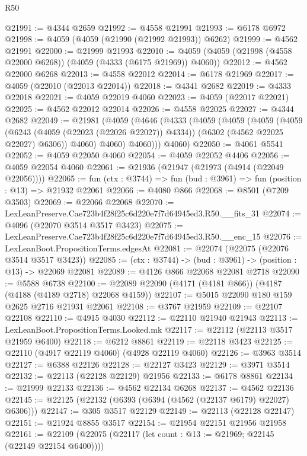 \begin{lexlean}{R50}
\begin{coremodule}
@21991 := @4344 @2659
@21992 := @4558 @21991
@21993 := @6178 @6972
@21998 := @4059 (@4059 (@21990 (@21992 @21993)) @6262)
@21999 := @4562 @21991
@22000 := @21999 @21993
@22010 := @4059 (@4059 (@21998 (@4558 @22000 @6268)) (@4059 (@4333 (@6175 @21969)) @4060))
@22012 := @4562 @22000 @6268
@22013 := @4558 @22012
@22014 := @6178 @21969
@22017 := @4059 (@22010 (@22013 @22014))
@22018 := @4341 @2682
@22019 := @4333 @22018
@22021 := @4059 @22019 @4060
@22023 := @4059 (@22017 @22021)
@22025 := @4562 @22012 @22014
@22026 := @4558 @22025
@22027 := @4344 @2682
@22049 := @21981
    (@4059
      (@4646
        (@4333
          (@4059
            (@4059
              (@4059
                (@4059
                  (@6243 (@4059 (@22023 (@22026 @22027)) @4334))
                  (@6302 (@4562 @22025 @22027) @6306))
                @4060)
              @4060)
            @4060)))
      @4060)
@22050 := @4061 @5541
@22052 := @4059 @22050 @4060
@22054 := @4059 @22052 @4406
@22056 := @4059 @22054 @4060
@22061 := @21936 (@21947 (@21973 (@4914 (@22049 @22056))))
@22065 := fun (ctx : @3744) => fun (bud : @3961) => fun (position : @13) => @21932 @22061
@22066 := @4080 @866
@22068 := @8501 (@7209 @3503)
@22069 := @22066 @22068
@22070 := LexLeanPreserve.Cae723b4f28f25c6d220e7f7d64945ed3.R50.__fits_31
@22074 := @4096 (@22070 @3514 @3517 @3423)
@22075 := LexLeanPreserve.Cae723b4f28f25c6d220e7f7d64945ed3.R50.__enc_15
@22076 := LexLeanBoot.PropositionTerms.edgesAt
@22081 := @22074 (@22075 (@22076 @3514 @3517 @3423))
@22085 := (ctx : @3744) -> (bud : @3961) -> (position : @13) -> @22069 @22081
@22089 := @4126 @866 @22068 @22081 @2718
@22090 := @5588 @6738
@22100 := @22089 @22090 (@4171 (@4181 @866)) (@4187 (@4188 (@4189 @2718) @22068 @4159))
@22107 := @5015 @22090 @180 @159 @2625 @2716 @21931 @22061
@22108 := @3767 @21959
@22109 := @22107 @22108
@22110 := @4915 @4030
@22112 := @22110 @21940 @21943
@22113 := LexLeanBoot.PropositionTerms.Looked.mk
@22117 := @22112 (@22113 @3517 @21959 @6400)
@22118 := @6212 @8861
@22119 := @22118 @3423
@22125 := @22110 (@4917 @22119 @4060) (@4928 @22119 @4060)
@22126 := @3963 @3514
@22127 := @6388 @22126
@22128 := @22127 @3423
@22129 := @3971 @3514
@22132 := @22113 (@22128 @22129) @21956
@22133 := @6178 @8861
@22134 := @21999 @22133
@22136 := @4562 @22134 @6268
@22137 := @4562 @22136
@22145 := @22125 (@22132 (@6393 (@6394 (@4562 (@22137 @6179) @22027) @6306)))
@22147 := @305 @3517 @22129
@22149 := @22113 (@22128 @22147)
@22151 := @21924 @8855 @3517
@22154 := @21954 @22151 @21956 @21958
@22161 := @22109 (@22075 (@22117 (let count : @13 := @21969; @22145 (@22149 @22154 @6400))))

\end{coremodule}
\end{lexlean}
